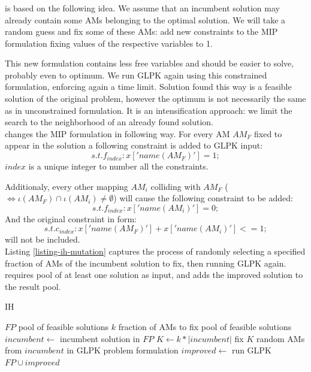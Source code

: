 \subsubsection{}

 is based on the following idea. We assume that an incumbent solution may already contain some AMs belonging to the optimal solution. We will take a random guess and fix some of these AMs: add new constraints to the MIP formulation fixing values of the respective variables to 1.

This new formulation contains less free variables and should be easier to solve, probably even to optimum. We run GLPK again using this constrained formulation, enforcing again a time limit. Solution found this way is a feasible solution of the original problem, however the optimum is not necessarily the same as in unconstrained formulation. It is an intensification approach: we limit the search to the neighborhood of an already found solution.\\

 changes the MIP formulation in following way. For every AM $AM_F$ fixed to appear in the solution a following constraint is added to GLPK input:
\[s.t. f_{index}: x['name(AM_F)'] = 1;\]
$index$ is a unique integer to number all the constraints.

Additionaly, every other mapping $AM_i$ colliding with $AM_F$ ($\iff \iota(AM_F) \cap \iota(AM_i) \neq \emptyset$) will cause the following constraint to be added:
\[s.t. f_{index}: x['name(AM_i)'] = 0;\]
And the original constraint in form:
\[s.t. c_{index}: x['name(AM_F)'] + x['name(AM_i)'] <= 1;\]
will not be included.\\

Listing \ref{listing-ih-mutation} captures the process of randomly selecting a specified fraction of AMs of the incumbent solution to fix, then running GLPK again.  requires pool of at least one solution as input, and adds the improved solution to the result pool.

\begin{algorithm}
\caption{ IH}
\label{listing-ih-mutation}
\begin{algorithmic}
\REQUIRE $FP$ pool of feasible solutions
\REQUIRE $k$ fraction of AMs to fix
\ENSURE pool of feasible solutions
\STATE $incumbent \gets $ incumbent solution in $FP$
\STATE $K \gets k * |incumbent|$
\STATE fix $K$ random AMs from $incumbent$ in GLPK problem formulation
\STATE $improved \gets $ run GLPK
\RETURN $FP \cup improved$
\end{algorithmic}
\end{algorithm}

